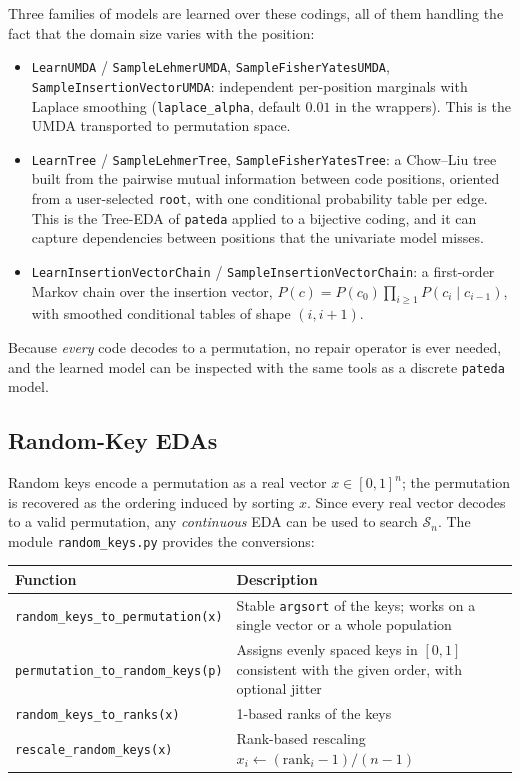 \documentclass[a4paper,11pt]{article}
\begin{document}
Three families of models are learned over these codings, all of them handling the
fact that the domain size varies with the position:

\begin{itemize}
  \item \texttt{LearnUMDA} / \texttt{SampleLehmerUMDA},
    \texttt{SampleFisherYatesUMDA}, \texttt{SampleInsertionVectorUMDA}:
    independent per-position marginals with Laplace smoothing
    (\texttt{laplace\_alpha}, default $0.01$ in the wrappers).  This is the
    UMDA \citep{Muhlenbein_and_Paas:1996} transported to permutation space.
  \item \texttt{LearnTree} / \texttt{SampleLehmerTree},
    \texttt{SampleFisherYatesTree}: a Chow--Liu tree \citep{Chow_and_Liu:1968}
    built from the pairwise mutual information between code positions, oriented
    from a user-selected \texttt{root}, with one conditional probability table
    per edge.  This is the Tree-EDA of \texttt{pateda} applied to a bijective
    coding, and it can capture dependencies between positions that the
    univariate model misses.
  \item \texttt{LearnInsertionVectorChain} /
    \texttt{SampleInsertionVectorChain}: a first-order Markov chain over the
    insertion vector, $P(c) = P(c_0)\prod_{i\geq 1} P(c_i \mid c_{i-1})$, with
    smoothed conditional tables of shape $(i, i+1)$.
\end{itemize}

Because \emph{every} code decodes to a permutation, no repair operator is ever
needed, and the learned model can be inspected with the same tools as a discrete
\texttt{pateda} model.

\subsection{Random-Key EDAs}

Random keys \citep{Bean:1994} encode a permutation as a real vector
$x \in [0,1]^n$; the permutation is recovered as the ordering induced by sorting
$x$.  Since every real vector decodes to a valid permutation, any
\emph{continuous} EDA can be used to search $\mathcal{S}_n$.  The module
\texttt{random\_keys.py} provides the conversions:

\begin{center}
\begin{tabular}{lp{9.2cm}}
\toprule
Function & Description \\
\midrule
\texttt{random\_keys\_to\_permutation(x)} & Stable \texttt{argsort} of the keys;
  works on a single vector or a whole population \\
\texttt{permutation\_to\_random\_keys(p)} & Assigns evenly spaced keys in
  $[0,1]$ consistent with the given order, with optional jitter \\
\texttt{random\_keys\_to\_ranks(x)} & 1-based ranks of the keys \\
\texttt{rescale\_random\_keys(x)} & Rank-based rescaling
  $x_i \leftarrow (\mathrm{rank}_i - 1)/(n-1)$ \\
\bottomrule
\end{tabular}
\end{center}
\end{document}
